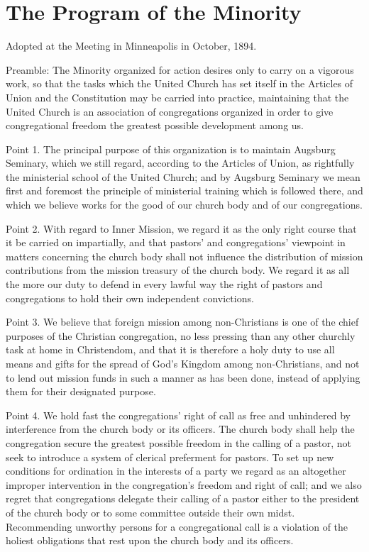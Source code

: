 

\section{The Program of the Minority}

Adopted at the Meeting in Minneapolis in October, 1894.

Preamble: The Minority organized for action desires only to carry on a vigorous work, so that the tasks which the United Church has set itself in the Articles of Union and the Constitution may be carried into practice, maintaining that the United Church is an association of congregations organized in order to give congregational freedom the greatest possible development among us.

Point 1. The principal purpose of this organization is to maintain Augsburg Seminary, which we still regard, according to the Articles of Union, as rightfully the ministerial school of the United Church; and by Augsburg Seminary we mean first and foremost the principle of ministerial training which is followed there, and which we believe works for the good of our church body and of our congregations.

Point 2. With regard to Inner Mission, we regard it as the only right course that it be carried on impartially, and that pastors’ and congregations’ viewpoint in matters concerning the church body shall not influence the distribution of mission contributions from the mission treasury of the church body. We regard it as all the more our duty to defend in every lawful way the right of pastors and congregations to hold their own independent convictions.

Point 3. We believe that foreign mission among non-Christians is one of the chief purposes of the Christian congregation, no less pressing than any other churchly task at home in Christendom, and that it is therefore a holy duty to use all means and gifts for the spread of God’s Kingdom among non-Christians, and not to lend out mission funds in such a manner as has been done, instead of applying them for their designated purpose.

Point 4. We hold fast the congregations’ right of call as free and unhindered by interference from the church body or its officers. The church body shall help the congregation secure the greatest possible freedom in the calling of a pastor, not seek to introduce a system of clerical preferment for pastors. To set up new conditions for ordination in the interests of a party we regard as an altogether improper intervention in the congregation’s freedom and right of call; and we also regret that congregations delegate their calling of a pastor either to the president of the church body or to some committee outside their own midst. Recommending unworthy persons for a congregational call is a violation of the holiest obligations that rest upon the church body and its officers.

